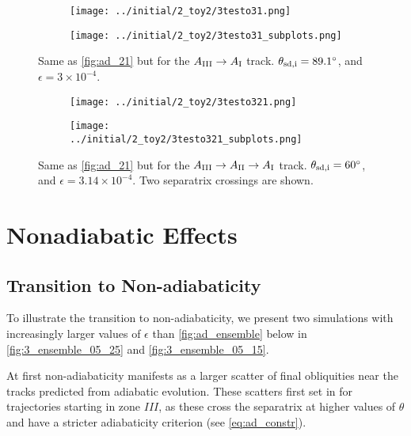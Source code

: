 \documentclass[
        fleqn,
        usenatbib,
        referee,
    ]{mnras}
\begin{document}
\begin{figure}
    \centering
    \begin{subfigure}{\columnwidth}
        \centering
        \texttt{[image: ../initial/2\_toy2/3testo31.png]}
    \end{subfigure}
    \begin{subfigure}{\columnwidth}
        \centering
        \texttt{[image: ../initial/2\_toy2/3testo31\_subplots.png]}
    \end{subfigure}
    \caption{Same as \autoref{fig:ad_21} but for the $A_{\rm III} \to A_{\rm I}$
    track. $\theta_{\rm sd, i} = 89.1^\circ$, and $\epsilon = 3 \times
    10^{-4}$.}\label{fig:ad_31}
\end{figure}
\begin{figure}
    \centering
    \begin{subfigure}{\columnwidth}
        \centering
        \texttt{[image: ../initial/2\_toy2/3testo321.png]}
    \end{subfigure}
    \begin{subfigure}{\columnwidth}
        \centering
        \texttt{[image: ../initial/2\_toy2/3testo321\_subplots.png]}
    \end{subfigure}
    \caption{Same as \autoref{fig:ad_21} but for the $A_{\rm III} \to A_{\rm II}
    \to A_{\rm I}$ track. $\theta_{\rm sd, i} = 60^\circ$, and $\epsilon = 3.14
    \times 10^{-4}$. Two separatrix crossings are shown.}\label{fig:ad_321}
\end{figure}

\section{Nonadiabatic Effects}\label{s:nonad}

\subsection{Transition to Non-adiabaticity}

To illustrate the transition to non-adiabaticity, we present two simulations
with increasingly larger values of $\epsilon$ than \autoref{fig:ad_ensemble}
below in \autoref{fig:3_ensemble_05_25} and \autoref{fig:3_ensemble_05_15}.

At first non-adiabaticity manifests as a larger scatter of final obliquities
near the tracks predicted from adiabatic evolution. These scatters first set in
for trajectories starting in zone $III$, as these cross the separatrix at higher
values of $\theta$ and have a stricter adiabaticity criterion (see
\autoref{eq:ad_constr}).
\end{document}
